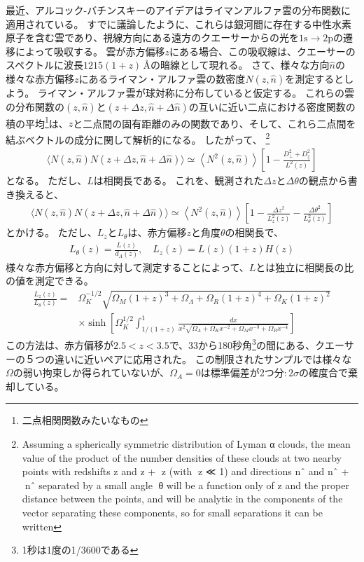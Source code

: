 \documentclass[11pt]{ltjsarticle}
\theoremstyle{plain}
\theoremstyle{break}
\begin{document}
最近、アルコック-バチンスキーのアイデアはライマンアルファ雲の分布関数に適用されている。
すでに議論したように、これらは銀河間に存在する中性水素原子を含む雲であり、視線方向にある遠方のクエーサーからの光を$1\mathrm{s} \to 2\mathrm{p}$の遷移によって吸収する。
雲が赤方偏移$z$にある場合、この吸収線は、クエーサーのスペクトルに波長$1215(1+z)\,\text{\AA}$の暗線として現れる。
さて、様々な方向$\hat{n}$の様々な赤方偏移$z$にあるライマン・アルファ雲の数密度$N(z,\hat{n})$を測定するとしよう。
ライマン・アルファ雲が球対称に分布していると仮定する。
これらの雲の分布関数の$(z,\hat{n})$と$(z+\Delta z, \hat{n} + \Delta \hat{n})$の互いに近い二点における密度関数の積の平均\footnote{二点相関関数みたいなもの}は、$z$と二点間の固有距離のみの関数であり、そして、これら二点間を結ぶベクトルの成分に関して解析的になる。
したがって、
\footnote{
Assuming a spherically symmetric distribution of Lyman α clouds, the mean value of the product of the number densities of these clouds at two nearby points with redshifts z and z + 􏰃z (with 􏰃z ≪ 1) and directions nˆ and nˆ + 􏰃nˆ separated by a small angle 􏰃θ will be a function only of z and the proper distance between the points, and will be analytic in the components of the vector separating these components, so for small separations it can be written
}
\begin{align}
  \langle N(z, \hat{n}) N(z+\Delta z, \hat{n}+\Delta \hat{n})\rangle \simeq\left\langle N^{2}(z, \hat{n})\right\rangle\left[1-\frac{D_{\perp}^{2}+D_{ \|}^{2}}{L^{2}(z)}\right]
\end{align}%
となる。
ただし、$L$は相関長である。
これを、観測された$\Delta z$と$\Delta \theta$の観点から書き換えると、
\begin{align}
  \langle N(z, \hat{n}) N(z+\Delta z, \hat{n}+\Delta \hat{n})\rangle \simeq\left\langle N^{2}(z, \hat{n})\right\rangle\left[1-\frac{\Delta z^{2}}{L_{z}^{2}(z)}-\frac{\Delta \theta^{2}}{L_{\theta}^{2}(z)}\right]
\end{align}%
とかける。
ただし、$L_{z}$と$L_{\theta}$は、赤方偏移$z$と角度$\theta$の相関長で、
\begin{align}
  L_{\theta}(z)=\frac{L(z)}{d_{A}(z)}, \quad L_{z}(z)=L(z)(1+z) H(z)
\end{align}%
様々な赤方偏移と方向に対して測定することによって、$L$とは独立に相関長の比の値を測定できる。
\begin{align} 
  \frac{L_{z}(z)}{L_{\theta}(z)}
    =& \Omega_{K}^{-1 / 2} \sqrt{\Omega_{M}(1+z)^{3}+\Omega_{\Lambda}+\Omega_{R}(1+z)^{4}+\Omega_{K}(1+z)^{2}} \\ 
      & \times \sinh \left[\Omega_{K}^{1 / 2} \int_{1 /(1+z)}^{1} \frac{d x}{x^{2} \sqrt{\Omega_{\Lambda}+\Omega_{K} x^{-2}+\Omega_{M} x^{-3}+\Omega_{R} x^{-4}}}\right] 
\end{align}
この方法は、赤方偏移が$2.5<z<3.5$で、33から180秒角\footnote{1秒は1度の1/3600である}の間にある、クエーサーの５つの違いに近いペアに応用された。
この制限されたサンプルでは様々な$\Omega$の弱い拘束しか得られていないが、$\Omega_{A}=0$は標準偏差が2つ分$:2\sigma$の確度合で棄却している。
\end{document}
